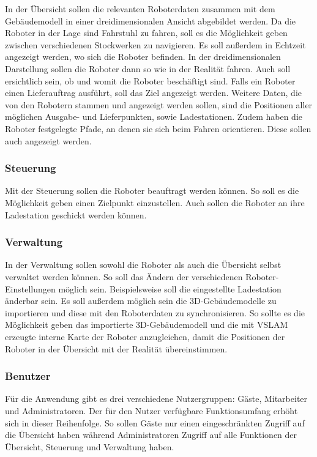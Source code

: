 In der Übersicht sollen die relevanten Roboterdaten zusammen mit dem Gebäudemodell in einer dreidimensionalen Ansicht abgebildet werden. Da die Roboter in der Lage sind Fahrstuhl zu fahren, soll es die Möglichkeit geben zwischen verschiedenen Stockwerken zu navigieren. Es soll außerdem in Echtzeit angezeigt werden, wo sich die Roboter befinden. In der dreidimensionalen Darstellung sollen die Roboter dann so wie in der Realität fahren. Auch soll ersichtlich sein, ob und womit die Roboter beschäftigt sind. Falls ein Roboter einen Lieferauftrag ausführt, soll das Ziel angezeigt werden. Weitere Daten, die von den Robotern stammen und angezeigt werden sollen, sind die Positionen aller möglichen Ausgabe- und Lieferpunkten, sowie Ladestationen. Zudem haben die Roboter festgelegte Pfade, an denen sie sich beim Fahren orientieren. Diese sollen auch angezeigt werden.

\subsubsection{Steuerung}

Mit der Steuerung sollen die Roboter beauftragt werden können. So soll es die Möglichkeit geben einen Zielpunkt einzustellen. Auch sollen die Roboter an ihre Ladestation geschickt werden können.

\subsubsection{Verwaltung}

In der Verwaltung sollen sowohl die Roboter als auch die Übersicht selbst verwaltet werden können. So soll das Ändern der verschiedenen Roboter-Einstellungen möglich sein. Beispielsweise soll die eingestellte Ladestation änderbar sein. Es soll außerdem möglich sein die 3D-Gebäudemodelle zu importieren und diese mit den Roboterdaten zu synchronisieren. So sollte es die Möglichkeit geben das importierte 3D-Gebäudemodell und die mit \ac{VSLAM} erzeugte interne Karte der Roboter anzugleichen, damit die Positionen der Roboter in der Übersicht mit der Realität übereinstimmen.

\subsubsection{Benutzer}

Für die Anwendung gibt es drei verschiedene Nutzergruppen: Gäste, Mitarbeiter und Administratoren. Der für den Nutzer verfügbare Funktionsumfang erhöht sich in dieser Reihenfolge. So sollen Gäste nur einen eingeschränkten Zugriff auf die Übersicht haben während Administratoren Zugriff auf alle Funktionen der Übersicht, Steuerung und Verwaltung haben.

